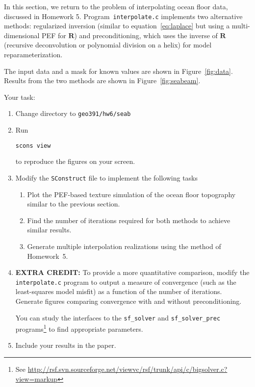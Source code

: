 In this section, we return to the problem of interpolating ocean floor
data, discussed in Homework 5. Program~\texttt{interpolate.c}
implements two alternative methods: regularized inversion (similar to
equation~\ref{eq:laplace} but using a multi-dimensional PEF for
$\mathbf{R}$) and preconditioning, which uses the inverse of
$\mathbf{R}$ (recursive deconvolution or polynomial division on a
helix) for model reparameterization.


The input data and a mask for known values are shown in
Figure~\ref{fig:data}. Results from the two methods are shown in Figure~\ref{fig:seabeam}.


\lstset{language=c,numbers=left,numberstyle=\tiny,showstringspaces=false}


\lstset{language=python,numbers=left,numberstyle=\tiny,showstringspaces=false}


Your task:
\begin{enumerate}
\item Change directory to \verb#geo391/hw6/seab#
\item Run 
\begin{verbatim}
scons view
\end{verbatim}
to reproduce the figures on your screen.
\item Modify the \texttt{SConstruct} file to implement the following tasks
\begin{enumerate}
\item Plot the PEF-based texture simulation of the ocean floor topography similar to the previous section.
\item Find the number of iterations required for both methods to achieve similar results.
\item Generate multiple interpolation realizations using the method of Homework~5.
\end{enumerate}
\item \textbf{EXTRA CREDIT:} To provide a more quantitative comparison, modify the
\texttt{interpolate.c} program to output a measure of convergence
(such as the least-squares model misfit) as a function of the number
of iterations. Generate figures comparing convergence with and without
preconditioning.

You can study the interfaces to the \texttt{sf\_solver} and
\texttt{sf\_solver\_prec} programs\footnote{See
\url{http://rsf.svn.sourceforge.net/viewvc/rsf/trunk/api/c/bigsolver.c?view=markup}}
to find appropriate parameters.
\item Include your results in the paper.
\end{enumerate}


